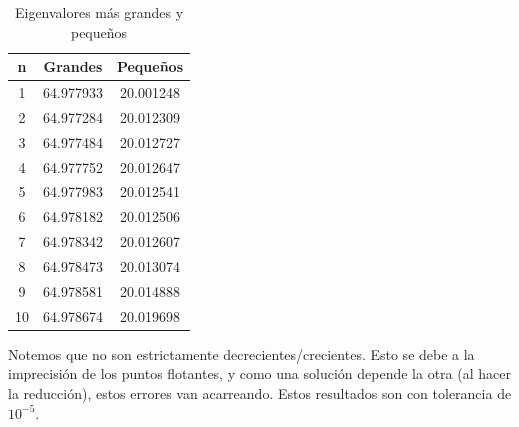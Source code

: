 \begin{solution}
	\begin{table}[H]
		\begin{center}
			\begin{tabular}{|c|c|c|}
				\hline
				n  & Grandes   & Peque\~nos \\
				\hline
				1  & 64.977933 & 20.001248  \\
				2  & 64.977284 & 20.012309  \\
				3  & 64.977484 & 20.012727  \\
				4  & 64.977752 & 20.012647  \\
				5  & 64.977983 & 20.012541  \\
				6  & 64.978182 & 20.012506  \\
				7  & 64.978342 & 20.012607  \\
				8  & 64.978473 & 20.013074  \\
				9  & 64.978581 & 20.014888  \\
				10 & 64.978674 & 20.019698  \\
				\hline
			\end{tabular}
		\end{center}
		\caption{Eigenvalores m\'as grandes y peque\~nos}
	\end{table}
  Notemos que no son estrictamente decrecientes/crecientes. Esto se debe a la
  imprecisi\'on de los puntos flotantes, y como una soluci\'on depende la otra
  (al hacer la reducci\'on), estos errores van acarreando. Estos resultados son con tolerancia de $ 10^{-5} $.
\end{solution}


